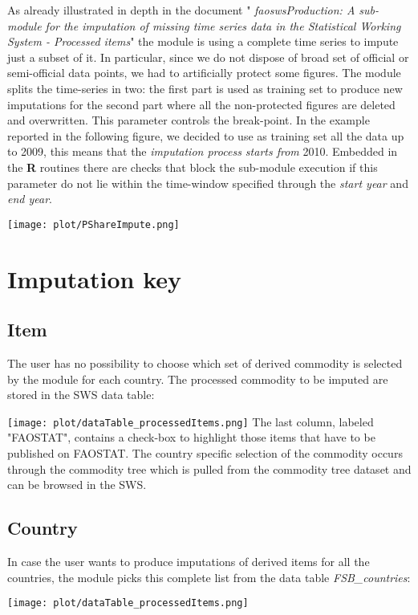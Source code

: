 \documentclass[nojss]{jss}
\begin{document}
As already illustrated in depth in the document "\textit{ faoswsProduction: A sub-module for the imputation of missing time series data in the Statistical Working System - Processed items}" the module is using a complete time series to impute just a subset of it. In particular, since we do not dispose of broad set of official or semi-official data points, we had to artificially protect some figures. The module splits the time-series in two: the first part is used as training set to produce new imputations for the second part where all the non-protected figures are deleted and overwritten. This parameter controls the break-point. In the example reported in the following figure, we decided to use as training  set all the data up to 2009, this means that the \textit{imputation process starts from} 2010.
Embedded in the \textbf{R} routines there are checks that block the sub-module execution if this parameter do not lie within the time-window specified through the \textit{start year} and \textit{end year}.

\texttt{[image: plot/PShareImpute.png]}

\section {Imputation key}

\subsection{Item}
The user has no possibility to choose which set of derived commodity is selected by the module for each country. The processed commodity to be imputed are stored in the SWS data table: 


\texttt{[image: plot/dataTable\_processedItems.png]}
The last column, labeled "FAOSTAT", contains a check-box to highlight those items that have to be published on FAOSTAT.
The country specific selection of the commodity occurs through the commodity tree which is pulled from the commodity tree dataset and can be browsed in the SWS.

\subsection{Country}

In  case the user wants to produce imputations of derived items for all the countries, the module picks this complete list from the data table \textit{FSB_countries}: 

\texttt{[image: plot/dataTable\_processedItems.png]}
\end{document}

